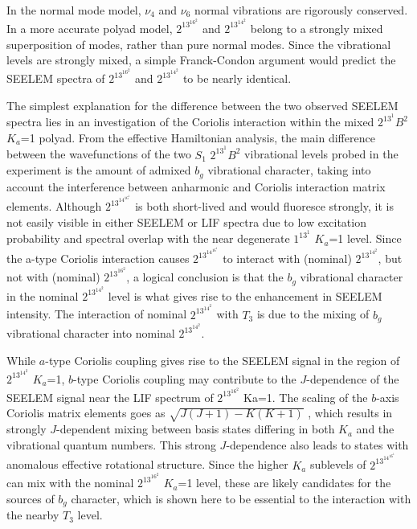 \documentclass[12pt,draft]{mitthesis}
\begin{document}
In the normal mode model, $\nu_4$ and $\nu_6$ normal vibrations are
rigorously conserved. In a more accurate polyad model, $2^13^16^2$ and
$2^13^14^2$ belong to a strongly mixed superposition of modes, rather
than pure normal modes. Since the vibrational levels are strongly
mixed, a simple Franck-Condon argument would predict the SEELEM
spectra of $2^13^16^2$ and $2^13^14^2$ to be nearly identical.

The simplest explanation for the difference between the two observed
SEELEM spectra lies in an investigation of the Coriolis interaction
within the mixed $2^13^1B^2$ $K_a$=1 polyad. From the effective
Hamiltonian analysis, the main difference between the wavefunctions of
the two $S_1$ $2^13^1B^2$ vibrational levels probed in the experiment
is the amount of admixed $b_g$ vibrational character, taking into account
the interference between anharmonic and Coriolis interaction matrix
elements. Although $2^13^14^16^1$ is both short-lived and would
fluoresce strongly, it is not easily visible in either SEELEM or LIF
spectra due to low excitation probability and spectral overlap with
the near degenerate $1^13^1$ $K_a$=1 level. Since the a-type Coriolis
interaction causes $2^13^14^16^1$ to interact with (nominal)
$2^13^14^2$, but not with (nominal) $2^13^16^2$, a logical conclusion
is that the $b_g$ vibrational character in the nominal $2^13^14^2$ level
is what gives rise to the enhancement in SEELEM intensity. The
interaction of nominal $2^13^14^2$ with $T_3$ is due to the mixing of
$b_g$ vibrational character into nominal $2^13^14^2$.

While $a$-type Coriolis coupling gives rise to the SEELEM signal in the
region of $2^13^14^2$ $K_a$=1, $b$-type Coriolis coupling may
contribute to the $J$-dependence of the SEELEM signal near the LIF
spectrum of $2^13^16^2$ Ka=1.  The scaling of the $b$-axis Coriolis
matrix elements goes as $\sqrt{J(J+1)-K(K+1)}$ , which results in strongly
$J$-dependent mixing between basis states differing in both $K_a$ and
the vibrational quantum numbers. This strong $J$-dependence also leads
to states with anomalous effective rotational structure. Since the
higher $K_a$ sublevels of $2^13^14^16^1$ can mix with the nominal
$2^13^16^2$ $K_a$=1 level, these are likely candidates for the sources
of $b_g$ character, which is shown here to be essential to the
interaction with the nearby $T_3$ level.



\end{document}
